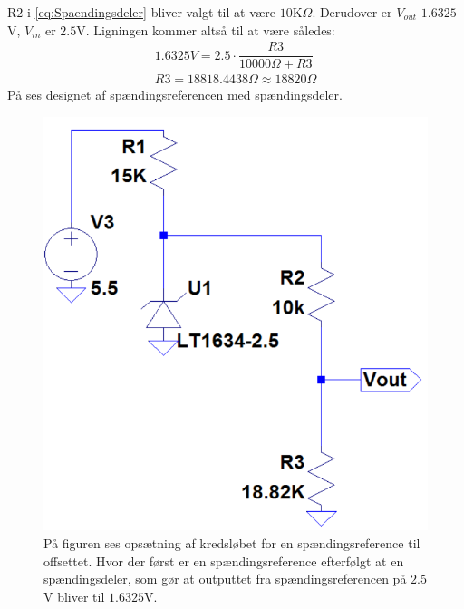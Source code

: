 R$2$ i \eqref{eq:Spaendingsdeler} bliver valgt til at være $10$K$\Omega$. Derudover er $V_{out}$ $1.6325$V, $V_{in}$ er $2.5$V. Ligningen kommer altså til at være således: 
\begin{eqnarray}
1.6325V = 2.5 \cdot \dfrac{R3}{10000\Omega + R3} \\
R3 = 18818.4438\Omega \approx 18820\Omega
\end{eqnarray}
\noindent På  ses designet af spændingsreferencen med spændingsdeler. 
\begin{figure}[H]
	\centering
	\includegraphics[scale=.5]{figures/cProblemloesning/OffsetSpaendingsRef2.PNG}
	\caption{På figuren ses opsætning af kredsløbet for en spændingsreference til offsettet. Hvor der først er en spændingsreference efterfølgt at en spændingsdeler, som gør at outputtet fra spændingsreferencen på $2.5$V bliver til $1.6325$V. }
	\label{fig:Spaendingsreference_offset}
\end{figure}

